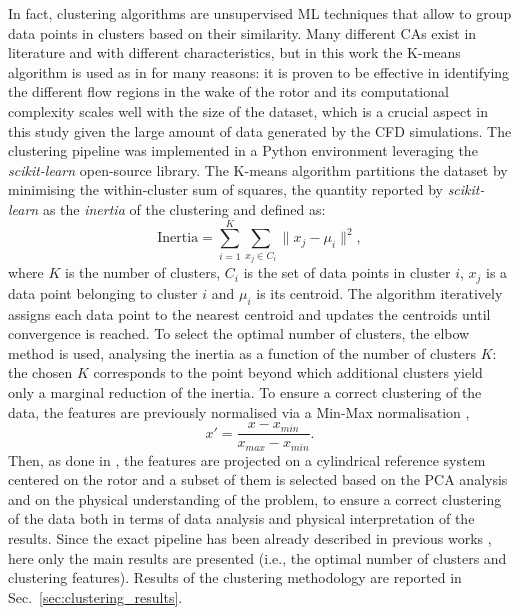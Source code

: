 In fact, clustering algorithms are unsupervised ML techniques that allow to group data points in clusters based on their similarity.
Many different CAs exist in literature and with different characteristics, but in this work the K-means algorithm is used as in \cite{Carloni2026,Clustering_tieghi} for many reasons: it is proven to be effective in identifying the different flow regions in the wake of the rotor and its computational complexity scales well with the size of the dataset, which is a crucial aspect in this study given the large amount of data generated by the CFD simulations. 
The clustering pipeline was implemented in a Python environment leveraging the \textit{scikit-learn} \cite{scikit-learn} open-source library. The K-means algorithm partitions the dataset by minimising the within-cluster sum of squares, the quantity reported by \textit{scikit-learn} as the \textit{inertia} of the clustering and defined as:
\begin{equation}
    \mathrm{Inertia} = \sum_{i=1}^{K} \sum_{x_j \in C_i} \lVert x_j - \mu_i \rVert^2 ,
\end{equation}
where $K$ is the number of clusters, $C_i$ is the set of data points in cluster $i$, $x_j$ is a data point belonging to cluster $i$ and $\mu_i$ is its centroid. The algorithm iteratively assigns each data point to the nearest centroid and updates the centroids until convergence is reached.
To select the optimal number of clusters, the elbow method is used, analysing the inertia as a function of the number of clusters $K$: the chosen $K$ corresponds to the point beyond which additional clusters yield only a marginal reduction of the inertia.
To ensure a correct clustering of the data, the features are previously normalised via a Min-Max normalisation \cite{scikit-learn},
\begin{equation}
    x' = \frac{x - x_{min}}{x_{max} - x_{min}} .
\end{equation}
Then, as done in \cite{Carloni2026,Clustering_tieghi}, the features are projected on a cylindrical reference system centered on the rotor and a subset of them is selected based on the PCA analysis and on the physical understanding of the problem, to ensure a correct clustering of the data both in terms of data analysis and physical interpretation of the results.
Since the exact pipeline has been already described in previous works \cite{Carloni2026,Clustering_tieghi}, here only the main results are presented (i.e., the optimal number of clusters  and clustering features).
Results of the clustering methodology are reported in Sec.~\ref{sec:clustering_results}.

